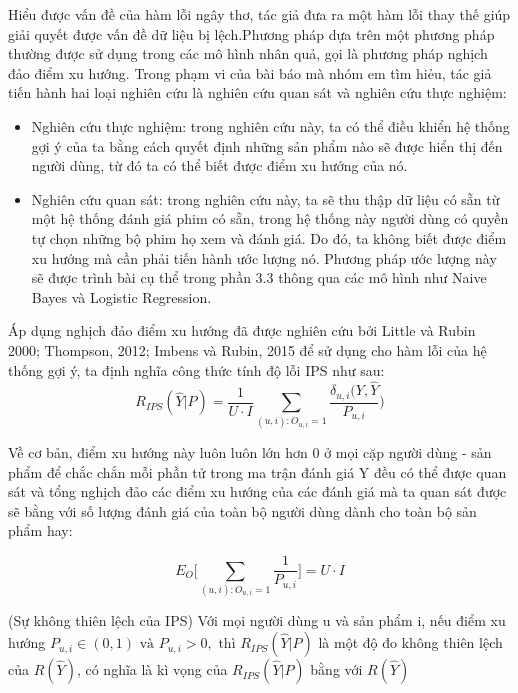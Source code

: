 Hiểu được vấn đề của hàm lỗi ngây thơ, tác giả đưa ra một hàm lỗi thay thế giúp giải quyết được vấn đề dữ liệu bị lệch.Phương pháp dựa trên một phương pháp thường được sử dụng trong các mô hình nhân quả, gọi là phương pháp nghịch đảo điểm xu hướng. Trong phạm vi của bài báo mà nhóm em tìm hiẻu, tác giả tiến hành hai loại nghiên cứu là nghiên cứu quan sát và nghiên cứu thực nghiệm:
\begin{itemize}
    \item Nghiên cứu thực nghiệm: trong nghiên cứu này, ta có thể điều khiển hệ thống gợi ý của ta bằng cách quyết định những sản phẩm nào sẽ được hiển thị đến người dùng, từ đó ta có thể biết được điểm xu hướng của nó.
    \item Nghiên cứu quan sát: trong nghiên cứu này, ta sẽ thu thập dữ liệu có sẵn từ một hệ thống đánh giá phim có sẵn, trong hệ thống này người dùng có quyền tự chọn những bộ phim họ xem và đánh giá. Do đó, ta không biết được điểm xu hướng mà cần phải tiến hành ước lượng nó. Phương pháp ước lượng này sẽ được trình bài cụ thể trong phần 3.3 thông qua các mô hình như Naive Bayes và Logistic Regression.
\end{itemize}

Áp dụng nghịch đảo điểm xu hướng đã được nghiên cứu bởi Little và Rubin 2000; Thompson, 2012; Imbens và Rubin, 2015 để sử dụng cho hàm lỗi của hệ thống gợi ý, ta định nghĩa công thức tính độ lỗi IPS như sau:
\begin{equation}
\label{eq:IPS}
R_{IPS}(\hat{Y}|P) = \frac{1}{U\cdot I}\sum_{(u,i):O_{u,i}=1} \frac{\delta_{u,i}(Y,\hat{Y}}{P_{u,i}})
\end{equation}

Về cơ bản, điểm xu hướng này luôn luôn lớn hơn 0 ở mọi cặp người dùng - sản phẩm để chắc chắn mỗi phần tử trong ma trận đánh giá Y đều có thể được quan sát và tổng nghịch đảo các điểm xu hướng của các đánh giá mà ta quan sát được sẽ bằng với số lượng đánh giá của toàn bộ người dùng dành cho toàn bộ sản phẩm hay:

\begin{equation}
\label{eq:EO}
E_O\bigg[\sum_{(u,i):O_{u,i}=1} \frac{1}{P_{u,i}}\bigg] = U \cdot I
\end{equation}

\begin{lemma}
(Sự không thiên lệch của IPS)
Với mọi người dùng u và sản phẩm i, nếu điểm xu hướng $P_{u,i} \in (0,1)\text{ và }  P_{u,i}>0, \text{ thì }  R_{IPS}(\hat{Y}|P)$ là một độ đo không thiên lệch của $R(\hat{Y})$, có nghĩa là kì vọng của $R_{IPS}(\hat{Y}|P)$ bằng với $R(\hat{Y})$
\end{lemma}

